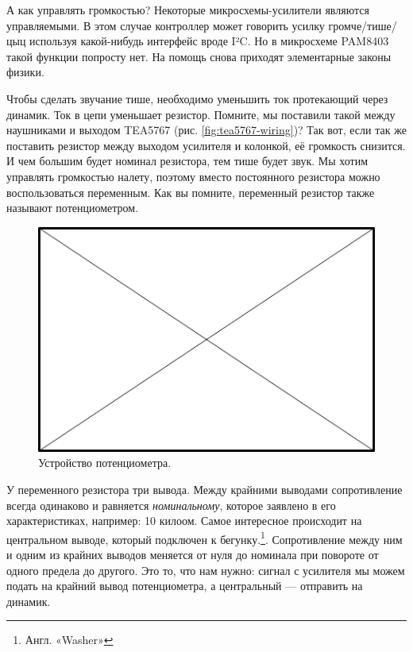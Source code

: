 А как управлять громкостью? Некоторые микросхемы-усилители являются управляемыми. В этом случае контроллер может говорить усилку громче/тише/цыц используя какой-нибудь интерфейс вроде I²C. Но в микросхеме PAM8403 такой функции попросту нет. На помощь снова приходят элементарные законы физики.

Чтобы сделать звучание тише, необходимо уменьшить ток протекающий через динамик. Ток в цепи уменьшает резистор. Помните, мы поставили такой между наушниками и выходом TEA5767 (рис. \ref{fig:tea5767-wiring})? Так вот, если так же поставить резистор между выходом усилителя и колонкой, её громкость снизится. И чем большим будет номинал резистора, тем тише будет звук. Мы хотим управлять громкостью налету, поэтому вместо постоянного резистора можно воспользоваться переменным. Как вы помните, переменный резистор также называют потенциометром.

\begin{figure}
  \centering
  \includegraphics{TODO.png}
  \caption{Устройство потенциометра.}
  \label{fig:pot-internals}
\end{figure}

У переменного резистора три вывода. Между крайними выводами сопротивление всегда одинаково и равняется \emph{номинальному}, которое заявлено в его характеристиках, например: 10 килоом. Самое интересное происходит на центральном выводе, который подключен к бегунку.\footnote{Англ. «Washer»}. Сопротивление между ним и одним из крайних выводов меняется от нуля до номинала при повороте от одного предела до другого. Это то, что нам нужно: сигнал с усилителя мы можем подать на крайний вывод потенциометра, а центральный — отправить на динамик.

